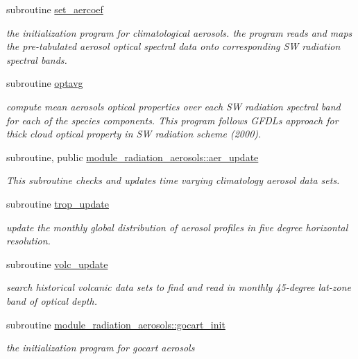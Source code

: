 \begin{DoxyCompactItemize}
subroutine \hyperlink{zhang__orig_2radiation__aerosols_8f_a95fabbc4272ae70f3b345f9b1a898d46}{set\+\_\+aercoef}
\begin{DoxyCompactList}\small\item\em the initialization program for climatological aerosols. the program reads and maps the pre-\/tabulated aerosol optical spectral data onto corresponding SW radiation spectral bands. \end{DoxyCompactList}\item 
subroutine \hyperlink{zhang__orig_2radiation__aerosols_8f_a637761b6110739f2d96322e2ddcc1291}{optavg}
\begin{DoxyCompactList}\small\item\em compute mean aerosols optical properties over each SW radiation spectral band for each of the species components. This program follows G\+F\+DL\textquotesingle{}s approach for thick cloud optical property in SW radiation scheme (2000). \end{DoxyCompactList}\item 
subroutine, public \hyperlink{group__module__radiation__aerosols_gaab6968d60e5e451758e40ec286d9e2ef}{module\+\_\+radiation\+\_\+aerosols\+::aer\+\_\+update}
\begin{DoxyCompactList}\small\item\em This subroutine checks and updates time varying climatology aerosol data sets. \end{DoxyCompactList}\item 
subroutine \hyperlink{zhang__orig_2radiation__aerosols_8f_afac9a9c603c033c8511e8dbfe984f703}{trop\+\_\+update}
\begin{DoxyCompactList}\small\item\em update the monthly global distribution of aerosol profiles in five degree horizontal resolution. \end{DoxyCompactList}\item 
subroutine \hyperlink{zhang__orig_2radiation__aerosols_8f_a6ec9bd68d45a5f2c6bb9997bdad420c3}{volc\+\_\+update}
\begin{DoxyCompactList}\small\item\em search historical volcanic data sets to find and read in monthly 45-\/degree lat-\/zone band of optical depth. \end{DoxyCompactList}\item 
subroutine \hyperlink{group__module__radiation__aerosols_gaed41923d67caaf1174eaa4303afdc55d}{module\+\_\+radiation\+\_\+aerosols\+::gocart\+\_\+init}
\begin{DoxyCompactList}\small\item\em the initialization program for gocart aerosols \end{DoxyCompactList}\item 

\end{DoxyCompactItemize}
